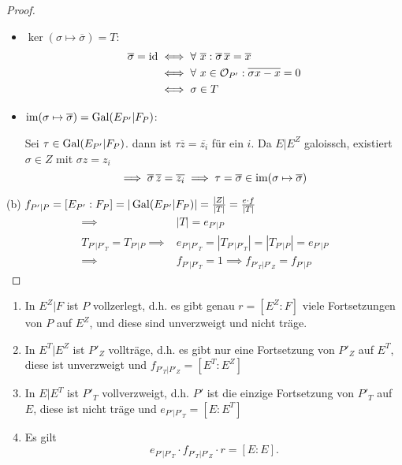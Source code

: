 \begin{proof}
\begin{itemize}
        \item $\ker (\sigma \mapsto \overline{\sigma}) = T$:
        \begin{align*}
            \overline{\sigma} = \operatorname{id} & \iff \forall~\overline{x}: \overline{\sigma}\,\overline{x} = \overline{x}\\
            & \iff \forall~x \in \mathcal{O}_{P'}: \overline{\sigma x - x} = 0\\
            & \iff \sigma \in T
        \end{align*}

        \item $\operatorname{im} (\sigma \mapsto \overline{\sigma}) = \operatorname{Gal}(E_{P'}|F_P)$:
        
        Sei $\tau \in \operatorname{Gal}(E_{P'}|F_P)$. dann ist $\tau \overline{z} = \overline{z_i}$ für ein $i$. Da $E|E^Z$ galoissch, existiert 
        $\sigma \in Z$ mit $\sigma z = z_i$ 
        $$ \implies \overline{\sigma}\, \overline{z} = \overline{z_i} \implies \tau = \overline{\sigma} \in \operatorname{im} (\sigma \mapsto \overline{\sigma})$$
    \end{itemize}

    (b) $f_{P'|P} = [E_{P'}:F_P] = |\operatorname{Gal}(E_{P'}|F_P)| = \frac{|Z|}{|T|} = \frac{e \cdot f}{|T|}$
    \begin{align*}
        \implies & |T| = e_{P'|P}\\
        T_{P'|P'_T} = T_{P'|P} \implies & e_{P'|P'_T} = |T_{P'|P'_T}| = |T_{P'|P}| = e_{P'|P}\\
        \implies & f_{P'|P'_T} = 1 \implies f_{P'_T|P'_Z} = f_{P'|P}
    \end{align*}
    \end{proof}

    \begin{korollar}
        \begin{enumerate}[label=(\alph*)]
            \item In $E^Z|F$ ist $P$ vollzerlegt, d.h. es gibt genau $r = [E^Z:F]$ viele Fortsetzungen von $P$ auf $E^Z$, und diese
            sind unverzweigt und nicht träge.

            \item In $E^T|E^Z$ ist $P'_Z$ vollträge, d.h. es gibt nur eine Fortsetzung von $P'_Z$ auf $E^T$, diese ist unverzweigt
            und $f_{P'_T|P'_Z} = [E^T:E^Z]$

            \item In $E|E^T$ ist $P'_T$ vollverzweigt, d.h. $P'$ ist die einzige Fortsetzung von $P'_T$ auf $E$, diese ist
            nicht träge und $e_{P'|P'_T} = [E:E^T]$

            \item Es gilt $$e_{P'|P'_T}\cdot f_{P'_T|P'_Z} \cdot r = [E:E].$$
        \end{enumerate}
    \end{korollar}


